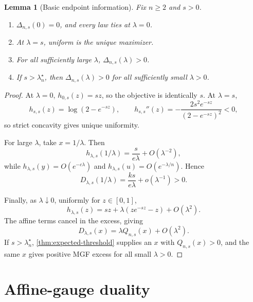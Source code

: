 \documentclass[11pt]{article}
\theoremstyle{plain}
\newtheorem{lemma}[theorem]{Lemma}
\theoremstyle{definition}
\theoremstyle{remark}
\begin{document}
\begin{lemma}[Basic endpoint information]\label{lem:mgf-endpoints}
Fix \(n\ge2\) and \(s>0\).
\begin{enumerate}[label=\textup{(\alph*)}]
\item \(\Delta_{n,s}(0)=0\), and every law ties at \(\lambda=0\).
\item At \(\lambda=s\), uniform is the unique maximizer.
\item For all sufficiently large \(\lambda\), \(\Delta_{n,s}(\lambda)>0\).
\item If \(s>\lambda_n^\star\), then \(\Delta_{n,s}(\lambda)>0\) for all sufficiently small \(\lambda>0\).
\end{enumerate}
\end{lemma}

\begin{proof}
At \(\lambda=0\), \(h_{0,s}(z)=sz\), so the objective is identically \(s\).  At \(\lambda=s\),
\[
h_{s,s}(z)=\log(2-e^{-sz}),\qquad
h_{s,s}''(z)=-\frac{2s^2e^{-sz}}{(2-e^{-sz})^2}<0,
\]
so strict concavity gives unique uniformity.

For large \(\lambda\), take \(x=1/\lambda\).  Then
\[
h_{\lambda,s}(1/\lambda)=\frac{s}{e\lambda}+O(\lambda^{-2}),
\]
while \(h_{\lambda,s}(y)=O(e^{-c\lambda})\) and \(h_{\lambda,s}(u)=O(e^{-\lambda/n})\).  Hence
\[
D_{\lambda,s}(1/\lambda)=\frac{ks}{e\lambda}+o(\lambda^{-1})>0.
\]

Finally, as \(\lambda\downarrow0\), uniformly for \(z\in[0,1]\),
\[
h_{\lambda,s}(z)=sz+\lambda(ze^{-sz}-z)+O(\lambda^2).
\]
The affine terms cancel in the excess, giving
\[
D_{\lambda,s}(x)=\lambda Q_{n,s}(x)+O(\lambda^2).
\]
If \(s>\lambda_n^\star\), \cref{thm:expected-threshold} supplies an \(x\) with \(Q_{n,s}(x)>0\), and the same \(x\) gives positive MGF excess for all small \(\lambda>0\).
\end{proof}

\section{Affine-gauge duality}
\end{document}
